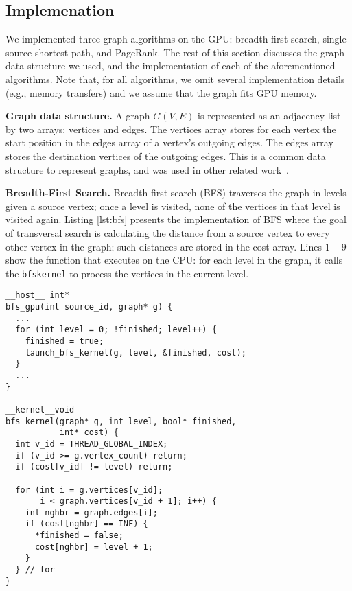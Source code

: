 \subsection{Implemenation}
\label{sec:implementation}

We implemented three graph algorithms on the GPU: breadth-first search, single source shortest path, and PageRank. The rest of this section discusses the graph data structure we used, and the implementation of each of the aforementioned algorithms. Note that, for all algorithms, we omit several implementation details (e.g., memory transfers) and we assume that the graph fits GPU memory.

\textbf{Graph data structure.} A graph $G(V,E)$ is represented as an adjacency list by two arrays: vertices and edges. The vertices array stores for each vertex the start position in the edges array of a vertex's outgoing edges. The edges array stores the destination vertices of the outgoing edges. This is a common data structure to represent graphs, and was used in other related work~\cite{Harish2007, Sungpack2010}.

{\bf Breadth-First Search.} Breadth-first search (BFS) traverses the graph in levels given a source vertex; once a level is visited, none of the vertices in that level is visited again. Listing \ref{lst:bfs} presents the implementation of BFS where the goal of transversal search is calculating the distance from a source vertex to every other vertex in the graph; such distances are stored in the cost array. Lines $1-9$ show the function that executes on the CPU: for each level in the graph, it calls the \texttt{bfskernel} to process the vertices in the current level.


\begin{lstlisting}[caption=Breadth-First Search Implementation,label=lst:bfs]
__host__ int*
bfs_gpu(int source_id, graph* g) {
  ...
  for (int level = 0; !finished; level++) {
    finished = true;
    launch_bfs_kernel(g, level, &finished, cost);
  }
  ...
}

__kernel__void
bfs_kernel(graph* g, int level, bool* finished,
           int* cost) {
  int v_id = THREAD_GLOBAL_INDEX;
  if (v_id >= g.vertex_count) return;
  if (cost[v_id] != level) return;

  for (int i = g.vertices[v_id]; 
       i < graph.vertices[v_id + 1]; i++) {
    int nghbr = graph.edges[i];
    if (cost[nghbr] == INF) {
      *finished = false;
      cost[nghbr] = level + 1;
    }
  } // for
}
\end{lstlisting}

